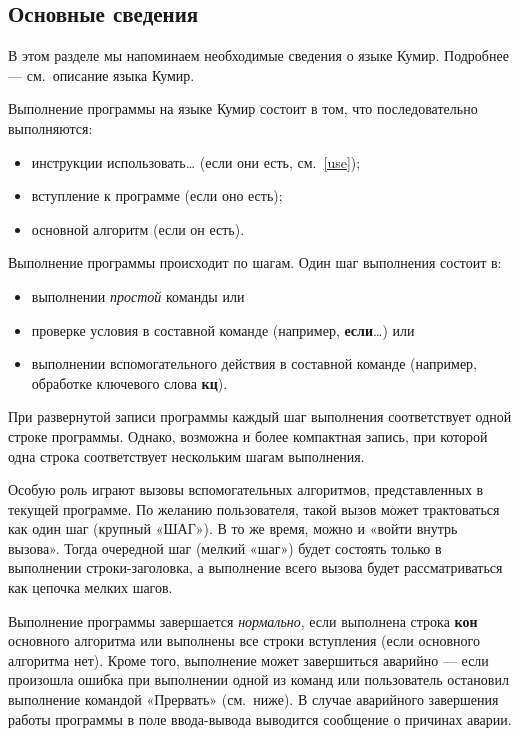 \subsection{Основные сведения}

В этом разделе мы напоминаем необходимые сведения о языке Кумир. Подробнее --- см.~описание языка Кумир.

Выполнение программы на языке Кумир состоит в том, что последовательно выполняются:
\begin{itemize}
\item инструкции \textsf{использовать\dots} (если они есть, см.~\ref{use});
\item вступление к программе (если оно есть);
\item основной алгоритм (если он есть).
\end{itemize}

Выполнение программы происходит по шагам. Один шаг выполнения состоит в:
\begin{itemize}
\item выполнении \emph{простой} команды или 
\item проверке условия в составной команде (например, \textsf{\textbf{если}\dots}) или 
\item выполнении вспомогательного действия в составной команде (например, обработке ключевого слова \textsf{\textbf{кц}}).
\end{itemize}

При развернутой записи программы каждый шаг выполнения соответствует одной строке программы. Однако, возможна и более компактная запись, при которой одна строка соответствует нескольким шагам выполнения.

Особую роль играют вызовы вспомогательных алгоритмов, представленных в текущей программе. По желанию пользователя, такой вызов может трактоваться как один шаг (крупный «ШАГ»). В то же время, можно и «войти внутрь вызова». Тогда очередной шаг (мелкий «шаг») будет состоять только в выполнении строки-заголовка, а выполнение всего вызова будет рассматриваться как цепочка мелких шагов.

Выполнение программы завершается \emph{нормально}, если выполнена строка \textsf{\textbf{кон}} основного алгоритма или выполнены все строки вступления (если основного алгоритма нет). Кроме того, выполнение может завершиться аварийно --- если произошла ошибка при выполнении одной из команд или пользователь остановил выполнение командой «Прервать» (см.~ниже). В случае аварийного завершения работы программы в поле ввода-вывода выводится сообщение о причинах аварии.

